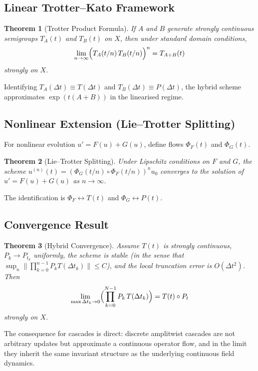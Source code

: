 \documentclass[12pt, a4paper]{article}
\newtheorem{theorem}{Theorem}[section]
\theoremstyle{remark}
\theoremstyle{definition}
\begin{document}
\subsection{Linear Trotter--Kato Framework}

\begin{theorem}[Trotter Product Formula]
If $A$ and $B$ generate strongly continuous semigroups $T_A(t)$ and $T_B(t)$ on $X$, then
under standard domain conditions,
\[
\lim_{n\to\infty}\Bigl(T_A(t/n)\,T_B(t/n)\Bigr)^n = T_{A+B}(t)
\]
strongly on $X$.
\end{theorem}

Identifying $T_A(\Delta t) \equiv T(\Delta t)$ and $T_B(\Delta t) \equiv P(\Delta t)$, the
hybrid scheme approximates $\exp(t(A+B))$ in the linearised regime.

\subsection{Nonlinear Extension (Lie--Trotter Splitting)}

For nonlinear evolution $u' = F(u) + G(u)$, define flows $\Phi_F(t)$ and $\Phi_G(t)$.

\begin{theorem}[Lie--Trotter Splitting]
Under Lipschitz conditions on $F$ and $G$, the scheme
$u^{(n)}(t) = (\Phi_G(t/n) \circ \Phi_F(t/n))^n u_0$
converges to the solution of $u' = F(u) + G(u)$ as $n \to \infty$.
\end{theorem}

The identification is $\Phi_F \leftrightarrow T(t)$ and $\Phi_G \leftrightarrow P(t)$.

\subsection{Convergence Result}

\begin{theorem}[Hybrid Convergence]
\label{thm:hybrid}
Assume $T(t)$ is strongly continuous, $P_k \to P_{t_k}$ uniformly, the scheme is stable
(in the sense that $\sup_n \|\prod_{k=0}^{n-1} P_k T(\Delta t_k)\| \le C$), and the local
truncation error is $O(\Delta t^2)$.  Then
\[
\lim_{\max\Delta t_k \to 0}
\Bigl(\prod_{k=0}^{N-1} P_k\,T(\Delta t_k)\Bigr)
= T(t)\circ P_t
\]
strongly on $X$.
\end{theorem}

The consequence for cascades is direct: discrete amplitwist cascades are not arbitrary
updates but approximate a continuous operator flow, and in the limit they inherit the same
invariant structure as the underlying continuous field dynamics.
\end{document}
